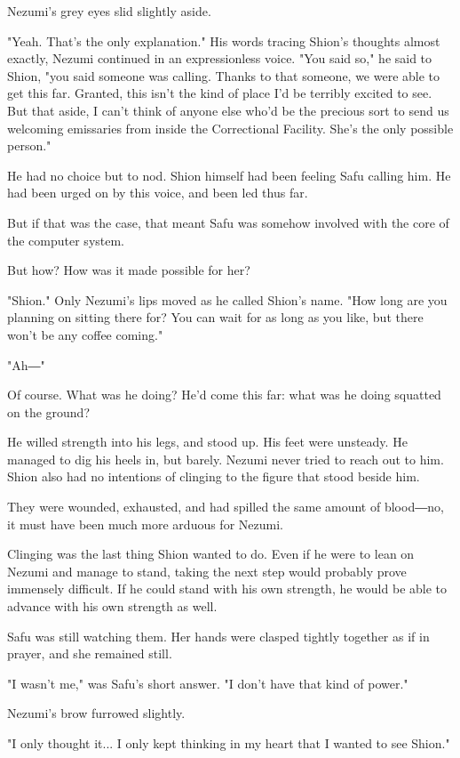 Nezumi's grey eyes slid slightly aside.

"Yeah. That's the only explanation." His words tracing Shion's thoughts
almost exactly, Nezumi continued in an expressionless voice. "You said
so," he said to Shion, "you said someone was calling. Thanks to that
someone, we were able to get this far. Granted, this isn't the kind of
place I'd be terribly excited to see. But that aside, I can't think of
anyone else who'd be the precious sort to send us welcoming emissaries
from inside the Correctional Facility. She's the only possible person."

He had no choice but to nod. Shion himself had been feeling Safu calling
him. He had been urged on by this voice, and been led thus far.

But if that was the case, that meant Safu was somehow involved with the
core of the computer system.

But how? How was it made possible for her?

"Shion." Only Nezumi's lips moved as he called Shion's name. "How long
are you planning on sitting there for? You can wait for as long as you
like, but there won't be any coffee coming."

"Ah―"

Of course. What was he doing? He'd come this far: what was he doing
squatted on the ground?

He willed strength into his legs, and stood up. His feet were unsteady.
He managed to dig his heels in, but barely. Nezumi never tried to reach
out to him. Shion also had no intentions of clinging to the figure that
stood beside him.

They were wounded, exhausted, and had spilled the same amount of
blood―no, it must have been much more arduous for Nezumi.

Clinging was the last thing Shion wanted to do. Even if he were to lean
on Nezumi and manage to stand, taking the next step would probably prove
immensely difficult. If he could stand with his own strength, he would
be able to advance with his own strength as well.

Safu was still watching them. Her hands were clasped tightly together as
if in prayer, and she remained still.

"I wasn't me," was Safu's short answer. "I don't have that kind of
power."

Nezumi's brow furrowed slightly.

"I only thought it... I only kept thinking in my heart that I wanted to
see Shion."

